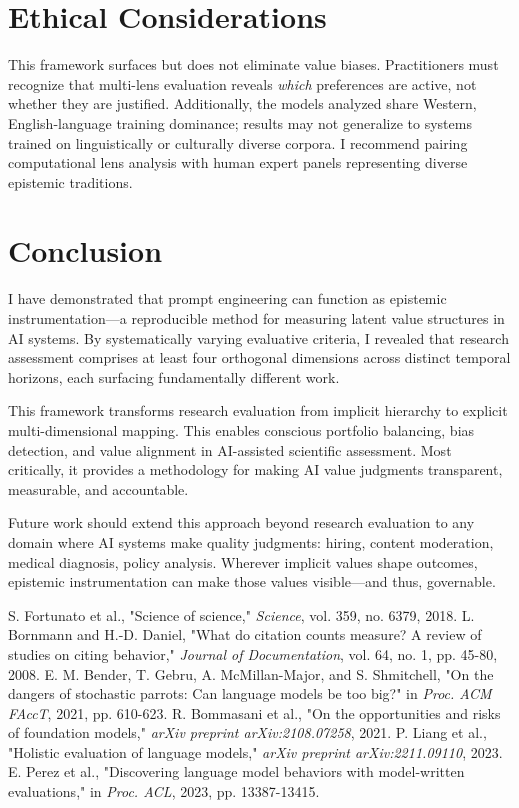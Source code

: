\documentclass{article}
\begin{document}
\section{Ethical Considerations}

This framework surfaces but does not eliminate value biases. Practitioners must recognize that multi-lens evaluation reveals \textit{which} preferences are active, not whether they are justified. Additionally, the models analyzed share Western, English-language training dominance; results may not generalize to systems trained on linguistically or culturally diverse corpora. I recommend pairing computational lens analysis with human expert panels representing diverse epistemic traditions.

\section{Conclusion}

I have demonstrated that prompt engineering can function as epistemic instrumentation—a reproducible method for measuring latent value structures in AI systems. By systematically varying evaluative criteria, I revealed that research assessment comprises at least four orthogonal dimensions across distinct temporal horizons, each surfacing fundamentally different work.

This framework transforms research evaluation from implicit hierarchy to explicit multi-dimensional mapping. This enables conscious portfolio balancing, bias detection, and value alignment in AI-assisted scientific assessment. Most critically, it provides a methodology for making AI value judgments transparent, measurable, and accountable.

Future work should extend this approach beyond research evaluation to any domain where AI systems make quality judgments: hiring, content moderation, medical diagnosis, policy analysis. Wherever implicit values shape outcomes, epistemic instrumentation can make those values visible—and thus, governable.

\begin{thebibliography}{00}
 S. Fortunato et al., "Science of science," \textit{Science}, vol. 359, no. 6379, 2018.
 L. Bornmann and H.-D. Daniel, "What do citation counts measure? A review of studies on citing behavior," \textit{Journal of Documentation}, vol. 64, no. 1, pp. 45-80, 2008.
 E. M. Bender, T. Gebru, A. McMillan-Major, and S. Shmitchell, "On the dangers of stochastic parrots: Can language models be too big?" in \textit{Proc. ACM FAccT}, 2021, pp. 610-623.
 R. Bommasani et al., "On the opportunities and risks of foundation models," \textit{arXiv preprint arXiv:2108.07258}, 2021.
 P. Liang et al., "Holistic evaluation of language models," \textit{arXiv preprint arXiv:2211.09110}, 2023.
 E. Perez et al., "Discovering language model behaviors with model-written evaluations," in \textit{Proc. ACL}, 2023, pp. 13387-13415.
\end{thebibliography}
\end{document}
